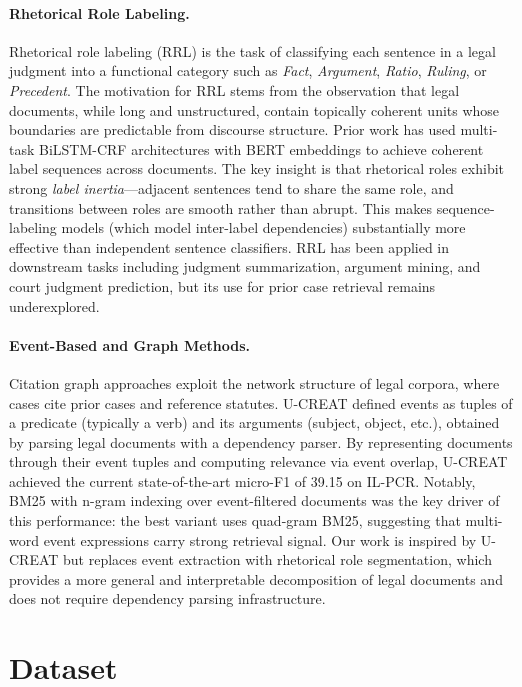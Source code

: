 \documentclass[11pt]{article}
\begin{document}
\paragraph{Rhetorical Role Labeling.}
Rhetorical role labeling (RRL) is the task of classifying each sentence in a legal judgment into a functional category such as \emph{Fact}, \emph{Argument}, \emph{Ratio}, \emph{Ruling}, or \emph{Precedent}.
The motivation for RRL stems from the observation that legal documents, while long and unstructured, contain topically coherent units whose boundaries are predictable from discourse structure.
Prior work \cite{malik2022rr} has used multi-task BiLSTM-CRF architectures with BERT embeddings to achieve coherent label sequences across documents.
The key insight is that rhetorical roles exhibit strong \emph{label inertia}---adjacent sentences tend to share the same role, and transitions between roles are smooth rather than abrupt.
This makes sequence-labeling models (which model inter-label dependencies) substantially more effective than independent sentence classifiers.
RRL has been applied in downstream tasks including judgment summarization, argument mining, and court judgment prediction, but its use for prior case retrieval remains underexplored.

\paragraph{Event-Based and Graph Methods.}
Citation graph approaches exploit the network structure of legal corpora, where cases cite prior cases and reference statutes.
U-CREAT \cite{joshi2023ucreat} defined events as tuples of a predicate (typically a verb) and its arguments (subject, object, etc.), obtained by parsing legal documents with a dependency parser.
By representing documents through their event tuples and computing relevance via event overlap, U-CREAT achieved the current state-of-the-art micro-F1 of 39.15 on IL-PCR.
Notably, BM25 with n-gram indexing over event-filtered documents was the key driver of this performance: the best variant uses quad-gram BM25, suggesting that multi-word event expressions carry strong retrieval signal.
Our work is inspired by U-CREAT but replaces event extraction with rhetorical role segmentation, which provides a more general and interpretable decomposition of legal documents and does not require dependency parsing infrastructure.

\section{Dataset}
\end{document}
